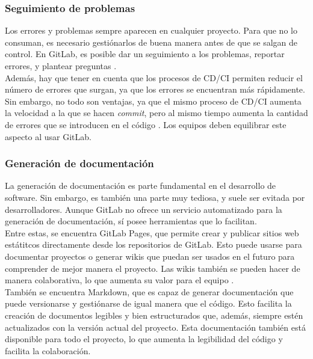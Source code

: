 \documentclass[runningheads]{llncs}
\begin{document}
\subsubsection{Seguimiento de problemas}
Los errores y problemas sempre aparecen en cualquier proyecto. Para que no lo consuman, es necesario gestiónarlos de
buena manera antes de que se salgan de control. En GitLab, es posible dar un seguimiento a los problemas, reportar
errores, y plantear preguntas \cite{choudhury2020gitlab}.\\
Además, hay que tener en cuenta que los procesos de CD/CI permiten reducir el número de errores que surgan, ya que los
errores se encuentran más rápidamente. Sin embargo, no todo son ventajas, ya que el mismo proceso de CD/CI aumenta la
velocidad a la que se hacen \textit{commit}, pero al mismo tiempo aumenta la cantidad de errores que se introducen en el
código \cite{fairbanks2023analyzing}. Los equipos deben equilibrar este aspecto al usar GitLab.
\subsubsection{Generación de documentación}
La generación de documentación es parte fundamental en el desarrollo de software. Sin embargo, es también una parte muy
tediosa, y suele ser evitada por desarrolladores. Aunque GitLab no ofrece un servicio automatizado para la generación de
documentación, sí posee herramientas que lo facilitan.\\
Entre estas, se encuentra GitLab Pages, que permite crear y publicar sitios web estátitcos directamente desde los repositorios
de GitLab. Esto puede usarse para documentar proyectos o generar wikis que puedan ser usados en el futuro para comprender de
mejor manera el proyecto. Las wikis también se pueden hacer de manera colaborativa, lo que aumenta su valor para el 
equipo \cite{choudhury2020gitlab,safari2020analysis}.\\
También se encuentra Markdown, que es capaz de generar documentación que puede versionarse y gestiónarse de igual manera que el
código. Esto facilita la creación de documentos legibles y bien estructurados que, además, siempre estén actualizados
con la versión actual del proyecto. Esta documentación también está disponible para todo el proyecto, lo que aumenta la
legibilidad del código y facilita la colaboración.
\end{document}
